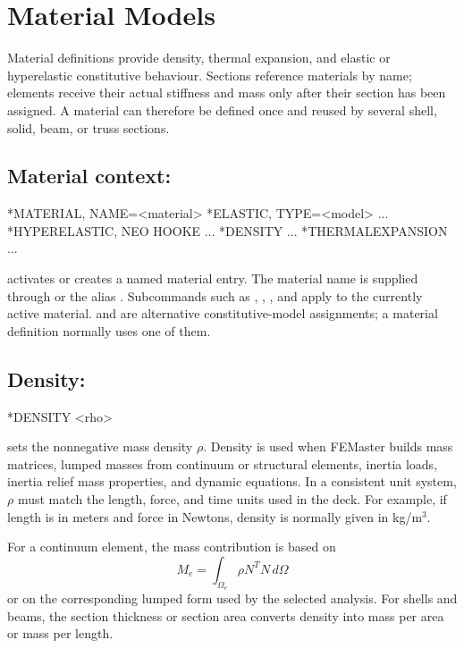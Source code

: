 \chapter{Material Models}
\label{chap:materials}

Material definitions provide density, thermal expansion, and elastic or hyperelastic constitutive behaviour. Sections reference materials by name; elements receive their actual stiffness and mass only after their section has been assigned. A material can therefore be defined once and reused by several shell, solid, beam, or truss sections.

\section{Material context: }

\begin{syntax}
*MATERIAL, NAME=<material>
  *ELASTIC, TYPE=<model>
  ...
  *HYPERELASTIC, NEO HOOKE
  ...
  *DENSITY
  ...
  *THERMALEXPANSION
  ...
\end{syntax}

 activates or creates a named material entry. The material name is supplied through  or the alias . Subcommands such as , , , and  apply to the currently active material.  and  are alternative constitutive-model assignments; a material definition normally uses one of them.

\section{Density: }

\begin{syntax}
*DENSITY
<rho>
\end{syntax}

 sets the nonnegative mass density \(\rho\). Density is used when FEMaster builds mass matrices, lumped masses from continuum or structural elements, inertia loads, inertia relief mass properties, and dynamic equations. In a consistent unit system, \(\rho\) must match the length, force, and time units used in the deck. For example, if length is in meters and force in Newtons, density is normally given in kg/m\(^3\).

For a continuum element, the mass contribution is based on
\[
M_e = \int_{\Omega_e} \rho N^T N \, d\Omega
\]
or on the corresponding lumped form used by the selected analysis. For shells and beams, the section thickness or section area converts density into mass per area or mass per length.

